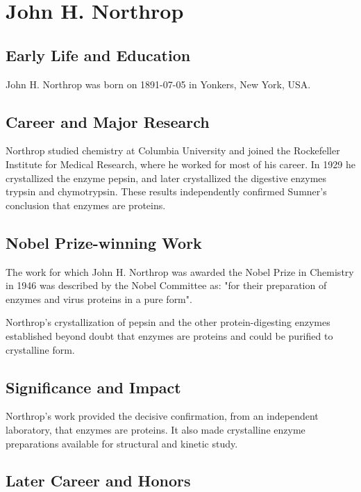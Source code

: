 \section{John H. Northrop}

\subsection*{Early Life and Education}

John H. Northrop was born on 1891-07-05 in Yonkers, New York, USA.

\subsection*{Career and Major Research}

Northrop studied chemistry at Columbia University and joined the Rockefeller Institute for Medical Research, where he worked for most of his career. In 1929 he crystallized the enzyme pepsin, and later crystallized the digestive enzymes trypsin and chymotrypsin. These results independently confirmed Sumner's conclusion that enzymes are proteins.

\subsection*{Nobel Prize-winning Work}

The work for which John H. Northrop was awarded the Nobel Prize in Chemistry in 1946 was described by the Nobel Committee as: "for their preparation of enzymes and virus proteins in a pure form".

Northrop's crystallization of pepsin and the other protein-digesting enzymes established beyond doubt that enzymes are proteins and could be purified to crystalline form.

\subsection*{Significance and Impact}

Northrop's work provided the decisive confirmation, from an independent laboratory, that enzymes are proteins. It also made crystalline enzyme preparations available for structural and kinetic study.

\subsection*{Later Career and Honors}


